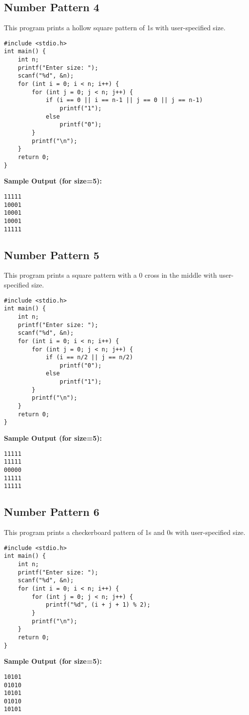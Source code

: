 \documentclass[a4paper,12pt]{article}
\begin{document}
\subsection{Number Pattern 4}
This program prints a hollow square pattern of 1s with user-specified size.
\begin{lstlisting}[caption={Number Pattern 4}]
#include <stdio.h>
int main() {
    int n;
    printf("Enter size: ");
    scanf("%d", &n);
    for (int i = 0; i < n; i++) {
        for (int j = 0; j < n; j++) {
            if (i == 0 || i == n-1 || j == 0 || j == n-1)
                printf("1");
            else
                printf("0");
        }
        printf("\n");
    }
    return 0;
}
\end{lstlisting}
\textbf{Sample Output (for size=5):}
\begin{verbatim}
11111
10001
10001
10001
11111
\end{verbatim}
\clearpage

\subsection{Number Pattern 5}
This program prints a square pattern with a 0 cross in the middle with user-specified size.
\begin{lstlisting}[caption={Number Pattern 5}]
#include <stdio.h>
int main() {
    int n;
    printf("Enter size: ");
    scanf("%d", &n);
    for (int i = 0; i < n; i++) {
        for (int j = 0; j < n; j++) {
            if (i == n/2 || j == n/2)
                printf("0");
            else
                printf("1");
        }
        printf("\n");
    }
    return 0;
}
\end{lstlisting}
\textbf{Sample Output (for size=5):}
\begin{verbatim}
11111
11111
00000
11111
11111
\end{verbatim}
\clearpage

\subsection{Number Pattern 6}
This program prints a checkerboard pattern of 1s and 0s with user-specified size.
\begin{lstlisting}[caption={Number Pattern 6}]
#include <stdio.h>
int main() {
    int n;
    printf("Enter size: ");
    scanf("%d", &n);
    for (int i = 0; i < n; i++) {
        for (int j = 0; j < n; j++) {
            printf("%d", (i + j + 1) % 2);
        }
        printf("\n");
    }
    return 0;
}
\end{lstlisting}
\textbf{Sample Output (for size=5):}
\begin{verbatim}
10101
01010
10101
01010
10101
\end{verbatim}
\clearpage
\end{document}
